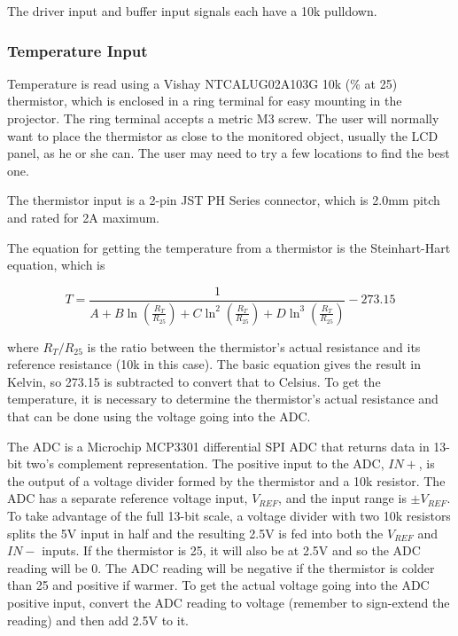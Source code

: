 \documentclass{article}
\begin{document}
The driver input and buffer input signals each have a 10k\textOmega{} pulldown.

\subsubsection{Temperature Input} \label{sssec:TempInput}
Temperature is read using a Vishay NTCALUG02A103G 10k (\% at 25\textcelsius) thermistor,
which is enclosed in a ring terminal for easy mounting in the projector.  The ring terminal accepts
a metric M3 screw.  The user will normally want to place the thermistor as close to the monitored
object, usually the LCD panel, as he or she can.  The user may need to try a few locations to find
the best one.

The thermistor input is a 2-pin JST PH Series connector, which is 2.0mm pitch and rated for 2A maximum.

The equation for getting the temperature from a thermistor is the Steinhart-Hart equation, which is

\[
T = \frac{1}{A + B\ln(\frac{R_T}{R_{25}}) + C\ln^2(\frac{R_T}{R_{25}}) + D\ln^3(\frac{R_T}{R_{25}})}
- 273.15
\]

where $R_T/R_{25}$ is the ratio between the thermistor's actual resistance and its reference
resistance (10k\textOmega{} in this case).  The basic equation gives the result in Kelvin, so 273.15
is subtracted to convert that to Celsius.  To get the temperature, it is necessary to determine the
thermistor's actual resistance and that can be done using the voltage going into the ADC.

The ADC is a Microchip MCP3301 differential SPI ADC that returns data in 13-bit two's complement
representation.  The positive input to the ADC, $IN+$, is the output of a voltage divider formed by
the thermistor and a 10k\textOmega{} resistor.  The ADC has a separate reference voltage input,
$V_{REF}$, and the input range is $\pm V_{REF}$.  To take advantage of the full 13-bit scale, a
voltage divider with two 10k\textOmega{} resistors splits the 5V input in half and the resulting
2.5V is fed into both the $V_{REF}$ and $IN-$ inputs.  If the thermistor is 25\textcelsius{}, it
will also be at 2.5V and so the ADC reading will be 0.  The ADC reading will be negative if the
thermistor is colder than 25\textcelsius{} and positive if warmer.  To get the actual voltage going
into the ADC positive input, convert the ADC reading to voltage (remember to sign-extend the
reading) and then add 2.5V to it.
\end{document}
